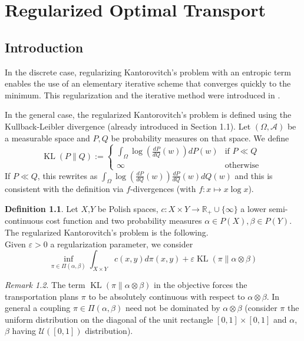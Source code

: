 \documentclass[12pt]{report}
\theoremstyle{definition}
\newtheorem{defi}{Definition}[section]
\theoremstyle{remark}
\newtheorem{rem}[defi]{Remark}
\DeclareMathOperator{\kl}{KL}
\begin{document}
\chapter{Regularized Optimal Transport}

\section{Introduction}

\hspace{\parindent} In the discrete case, regularizing Kantorovitch's problem with an entropic term enables the use of an elementary iterative scheme that converges quickly to the minimum. This regularization and the iterative method were introduced in \cite{cuturi2013sinkhorn}.
\\
\par
In the general case, the regularized Kantorovitch's problem is defined using the Kullback-Leibler divergence (already introduced in Section 1.1). Let $(\Omega,\mathcal A)$ be a measurable space and $P,Q$ be probability measures on that space. We define $$\kl(P\|Q):= \begin{cases}
	\int_\Omega \log\left(\frac{dP}{dQ}(w) \right) dP(w) &\text{if } P\ll Q\\
	\infty &\text{otherwise }
\end{cases}$$
If $P\ll Q$, this rewrites as $\int_\Omega \log\left(\frac{dP}{dQ}(w) \right) \frac{dP}{dQ}(w) dQ(w)$ and this is consistent with the definition via $f$-divergences (with $f:x\mapsto x\log x$).

\begin{defi}
	Let $X$,$Y$ be Polish spaces, $c:X\times Y\to \mathbb R_+\cup \{\infty\}$ a lower semi-continuous cost function and two probability measures $\alpha\in P(X), \beta\in P(Y)$. The regularized Kantorovitch's problem is the following.\\
	Given $\varepsilon>0$ a regularization parameter, we consider 
	\begin{equation}\tag{Regularized KP}\label{rKP}
	\inf_{\pi\in \Pi(\alpha, \beta)} \int_{X\times Y} c(x,y) d\pi(x,y) + \varepsilon\kl(\pi\|\alpha\otimes \beta)
	\end{equation}
\end{defi}

\begin{rem}
	The term $\kl(\pi\|\alpha\otimes \beta)$ in the objective forces the transportation plans $\pi$ to be absolutely continuous with respect to $\alpha\otimes \beta$. In general a coupling $\pi\in \Pi(\alpha,\beta)$ need not be dominated by $\alpha\otimes \beta$ (consider $\pi$ the uniform distribution on the diagonal of the unit rectangle $[0,1]\times [0,1]$ and $\alpha$, $\beta$ having $\mathcal U([0,1])$ distribution).
\end{rem}
\end{document}
